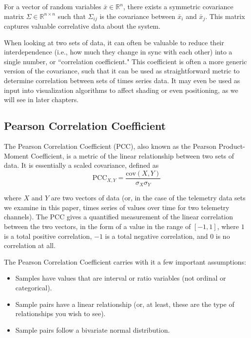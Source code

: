 For a vector of random variables $\bar{x} \in \mathbb{R}^{n}$, there exists a symmetric covariance matrix $\Sigma \in \mathbb{R}^{n \times n}$ such that $\Sigma_{ij}$ is the covariance between $\bar{x}_{i}$ and $\bar{x}_{j}$. This matrix captures valuable correlative data about the system.

When looking at two sets of data, it can often be valuable to reduce their interdependence (i.e., how much they change in sync with each other) into a single number, or ``correlation coefficient." This coefficient is often a more generic version of the covariance, such that it can be used as straightforward metric to determine correlation between sets of times series data. It may even be used as input into visualization algorithms to affect shading or even positioning, as we will see in later chapters.

\subsection{Pearson Correlation Coefficient}

The Pearson Correlation Coefficient (PCC), also known as the Pearson Product-Moment Coefficient, is a metric of the linear relationship between two sets of data. It is essentially a scaled covariance, defined as \\
\begin{equation} \label{eq:pcc}
\text{PCC}_{X, Y} = \frac{\mathrm{cov}(X, Y)}{\sigma_{X} \sigma_{Y}}
\end{equation}

where $X$ and $Y$ are two vectors of data (or, in the case of the telemetry data sets we examine in this paper, times series of values over time for two telemetry channels). The PCC gives a quantified measurement of the linear correlation between the two vectors, in the form of a value in the range of $[-1, 1]$, where $1$ is a total positive correlation, $-1$ is a total negative correlation, and $0$ is no correlation at all.

The Pearson Correlation Coefficient carries with it a few important assumptions:

\begin{itemize}
\item Samples have values that are interval or ratio variables (not ordinal or categorical).
\item Sample pairs have a linear relationship (or, at least, these are the type of relationships you wish to see).
\item Sample pairs follow a bivariate normal distribution.
\end{itemize}

